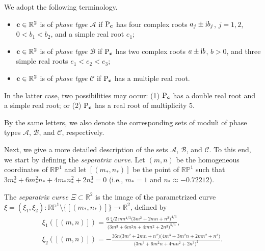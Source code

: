 \documentclass[pdftex]{sigma}
\numberwithin{equation}{section}
\def\R{\mathbb{R}}
\begin{document}
\begin{Definition}%
We adopt the following terminology.
\begin{itemize}\itemsep=0pt

\item ${\bf c}\in \R^2$ is of \emph{phase type ${\mathcal A}$} if ${\rm P}_{{\bf c}}$ has four complex roots $a_j\pm {\rm i}b_j$, $j=1,2$, $0<b_1<b_2$,
and a simple real root $e_1$;

\item ${\bf c}\in \R^2$ is of \emph{phase type ${\mathcal B}$} if ${\rm P}_{{\bf c}}$ has two complex roots $a \pm {\rm i}b$,
$b>0$, and three simple real roots
$e_1<e_2<e_3$;

\item ${\bf c}\in \R^2$ is of \emph{phase type} ${\mathcal C}$ if ${\rm P}_{{\bf c}}$ has a multiple {real} root.
\end{itemize}
In the latter case, two possibilities may occur: (1) ${\rm P}_{{\bf c}}$ has a double real root and a simple real root; or
(2) ${\rm P}_{{\bf c}}$ has a {real} root of multiplicity $5$.
%

By the same letters, we also denote the corresponding sets of moduli of
phase types ${\mathcal A}$, ${\mathcal B}$, and ${\mathcal C}$, respectively.
\end{Definition}

Next, we give a more detailed description of the sets ${\mathcal A}$, ${\mathcal B}$, and ${\mathcal C}$.
%
%
To this end, we start by defining the \emph{separatrix curve}. Let
$(m,n)$ be the homogeneous coordinates of $\mathbb{RP}^1$ and let $[(m_*,n_*)]$ be the point of $\mathbb{RP}^1$ such that $3m_*^3+6m_*^2n_*+4m_*n_*^2+2n_*^3=0$ (i.e., $m_*=1$ and $n_*\approx-0.72212$).

\begin{Definition}
The \emph{separatrix curve} $\Xi\subset \R^2$ is the image of the parametrized curve
$\xi =(\xi_1,\xi_2) \colon \mathbb{RP}^1\setminus\{[(m_*,n_*)]\}\to \R^2$, defined by
\begin{gather*}
{\xi_1([(m,n)])}=\frac{6\sqrt[3]{2}mn^{4/3}\big(3m^2+2mn+n^2\big)^{4/3}}{\big(3m^3+6m^2n+4mn^2+2n^3\big)^{5/3}},\\
{\xi_2([(m,n)])}=-\frac{36n\big(3m^2+2mn+n^2\big)\big(4m^3+3m^2n+2mn^2+n^3\big)}{\big(3m^3+6m^2n+4mn^2 + 2n^3\big)^{2}}.
\end{gather*}
\end{Definition}
\end{document}
